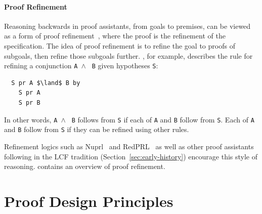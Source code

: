 \paragraph{Proof Refinement}
Reasoning backwards in proof assistants, from goals to premises, can be viewed as a form of proof refinement~\citep{Bates1979, krafft1981},
where the proof is the refinement of the specification. The idea of proof refinement is to refine the goal to proofs of subgoals, then refine
those subgoals further.
\cite{Bates1979}, for example, describes the rule for refining a conjunction \lstinline{A }$\land$ \lstinline{ B} given hypotheses \lstinline{S}:
\begin{lstlisting}
  S pr A $\land$ B by
    S pr A
    S pr B
\end{lstlisting}
In other words, \lstinline{A }$\land$ \lstinline{ B} follows from \lstinline{S} if each of \lstinline{A} and \lstinline{B} follow from \lstinline{S}.
Each of \lstinline{A} and \lstinline{B} follow from \lstinline{S} if they can be refined using other rules.

Refinement logics such as Nuprl~\citep{Constable1986} and RedPRL~\citep{angiuli2018} as well as other proof assistants following
in the LCF tradition (Section~\ref{sec:early-history}) encourage this style of reasoning.
\cite{SterlingH17} contains an overview of proof refinement.

%
%

\section{Proof Design Principles}
\label{sec:proofdes}


